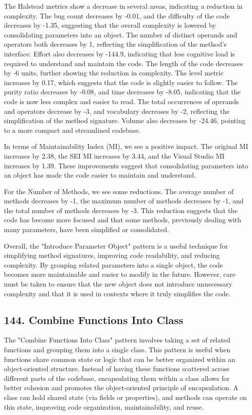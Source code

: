 The Halstead metrics show a decrease in several areas, indicating a reduction in complexity. The bug count decreases by -0.01, and the difficulty of the code decreases by -1.35, suggesting that the overall complexity is lowered by consolidating parameters into an object. The number of distinct operands and operators both decreases by 1, reflecting the simplification of the method's interface. Effort also decreases by -144.9, indicating that less cognitive load is required to understand and maintain the code. The length of the code decreases by -6 units, further showing the reduction in complexity. The level metric increases by 0.17, which suggests that the code is slightly easier to follow. The purity ratio decreases by -0.08, and time decreases by -8.05, indicating that the code is now less complex and easier to read. The total occurrences of operands and operators decrease by -3, and vocabulary decreases by -2, reflecting the simplification of the method signature. Volume also decreases by -24.46, pointing to a more compact and streamlined codebase.

In terms of Maintainability Index (MI), we see a positive impact. The original MI increases by 2.38, the SEI MI increases by 3.44, and the Visual Studio MI increases by 1.39. These improvements suggest that consolidating parameters into an object has made the code easier to maintain and understand.

For the Number of Methods, we see some reductions. The average number of methods decreases by -1, the maximum number of methods decreases by -1, and the total number of methods decreases by -3. This reduction suggests that the code has become more focused and that some methods, previously dealing with many parameters, have been simplified or consolidated.

Overall, the "Introduce Parameter Object" pattern is a useful technique for simplifying method signatures, improving code readability, and reducing complexity. By grouping related parameters into a single object, the code becomes more maintainable and easier to modify in the future. However, care must be taken to ensure that the new object does not introduce unnecessary complexity and that it is used in contexts where it truly simplifies the code.

\subsection{144. Combine Functions Into Class}

The "Combine Functions Into Class" pattern involves taking a set of related functions and grouping them into a single class. This pattern is useful when functions share common state or logic that can be better organized within an object-oriented structure. Instead of having these functions scattered across different parts of the codebase, encapsulating them within a class allows for better cohesion and promotes the object-oriented principle of encapsulation. A class can hold shared state (via fields or properties), and methods can operate on this state, improving code organization, maintainability, and reuse.

